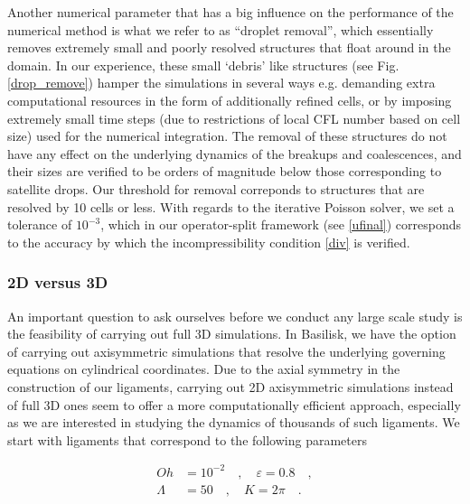 Another numerical parameter that has a big influence on the performance of 
the numerical method is what we refer to as ``droplet removal'', 
which essentially removes extremely small and poorly 
resolved structures that float around in the domain. 
In our experience, these small `debris' like structures (see Fig. \ref{drop_remove})
hamper the simulations in several ways e.g. demanding extra computational 
resources in the form of additionally refined cells, 
or by imposing extremely small time steps (due to restrictions of 
local CFL number based on cell size) used for the numerical integration. 
The removal of these structures do not have any effect on the 
underlying dynamics of the breakups and coalescences, and their sizes 
are verified to be orders of magnitude below those corresponding to satellite drops. 
Our threshold for removal correponds to structures that are resolved by 10 cells or less. 
With regards to the iterative Poisson solver, we set a tolerance of $10^{-3}$, which in our
operator-split framework (see \eqref{ufinal}) corresponds to the 
accuracy by which the incompressibility condition \eqref{div} is verified. 

\subsubsection*{2D versus 3D}

An important question to ask ourselves before we conduct any large scale
study is the feasibility of carrying out full 3D simulations. 
In Basilisk, we have the option of carrying out axisymmetric simulations
that resolve the underlying governing equations on cylindrical coordinates. 
Due to the axial symmetry in the construction of our ligaments, carrying 
out 2D axisymmetric simulations instead of full 3D ones seem to offer a more 
computationally efficient approach, especially as we are interested in studying
the dynamics of thousands of such ligaments. 
We start with ligaments that correspond to the following parameters

\begin{align}
	Oh &= 10^{-2} \quad, \quad \varepsilon = 0.8 \quad , \\
	\Lambda &= 50 \quad , \quad K = 2\pi \quad .
\label{base_params}
\end{align}

